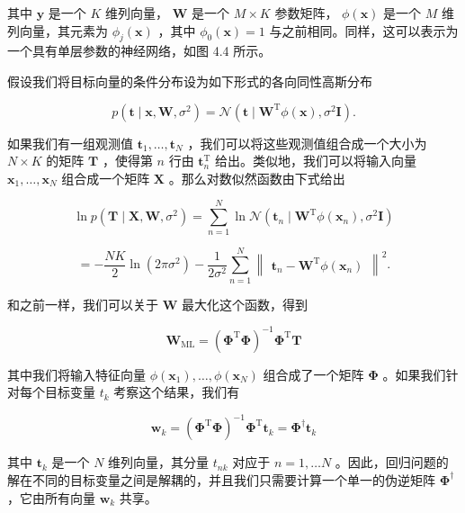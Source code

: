 \documentclass[10pt]{report}
\begin{document}
其中 \(\mathbf{y}\) 是一个 \(K\) 维列向量， \(\mathbf{W}\) 是一个 \(M \times  K\) 参数矩阵， \(\phi \left( \mathbf{x}\right)\) 是一个 \(M\) 维列向量，其元素为 \({\phi }_{j}\left( \mathbf{x}\right)\) ，其中 \({\phi }_{0}\left( \mathbf{x}\right)  = 1\) 与之前相同。同样，这可以表示为一个具有单层参数的神经网络，如图 4.4 所示。

假设我们将目标向量的条件分布设为如下形式的各向同性高斯分布

\[
p\left( {\mathbf{t} \mid  \mathbf{x},\mathbf{W},{\sigma }^{2}}\right)  = \mathcal{N}\left( {\mathbf{t} \mid  {\mathbf{W}}^{\mathrm{T}}\phi \left( \mathbf{x}\right) ,{\sigma }^{2}\mathbf{I}}\right) . \tag{4.29}
\]

如果我们有一组观测值 \({\mathbf{t}}_{1},\ldots ,{\mathbf{t}}_{N}\) ，我们可以将这些观测值组合成一个大小为 \(N \times  K\) 的矩阵 \(\mathbf{T}\) ，使得第 \(n\) 行由 \({\mathbf{t}}_{n}^{\mathrm{T}}\) 给出。类似地，我们可以将输入向量 \({\mathbf{x}}_{1},\ldots ,{\mathbf{x}}_{N}\) 组合成一个矩阵 \(\mathbf{X}\) 。那么对数似然函数由下式给出

\[
\ln p\left( {\mathbf{T} \mid  \mathbf{X},\mathbf{W},{\sigma }^{2}}\right)  = \mathop{\sum }\limits_{{n = 1}}^{N}\ln \mathcal{N}\left( {{\mathbf{t}}_{n} \mid  {\mathbf{W}}^{\mathrm{T}}\phi \left( {\mathbf{x}}_{n}\right) ,{\sigma }^{2}\mathbf{I}}\right)
\]

\[
=  - \frac{NK}{2}\ln \left( {{2\pi }{\sigma }^{2}}\right)  - \frac{1}{2{\sigma }^{2}}\mathop{\sum }\limits_{{n = 1}}^{N}{\begin{Vmatrix}{\mathbf{t}}_{n} - {\mathbf{W}}^{\mathrm{T}}\phi \left( {\mathbf{x}}_{n}\right) \end{Vmatrix}}^{2}. \tag{4.30}
\]

和之前一样，我们可以关于 \(\mathbf{W}\) 最大化这个函数，得到

\[
{\mathbf{W}}_{\mathrm{{ML}}} = {\left( {\mathbf{\Phi }}^{\mathrm{T}}\mathbf{\Phi }\right) }^{-1}{\mathbf{\Phi }}^{\mathrm{T}}\mathbf{T} \tag{4.31}
\]

其中我们将输入特征向量 \(\phi \left( {\mathbf{x}}_{1}\right) ,\ldots ,\phi \left( {\mathbf{x}}_{N}\right)\) 组合成了一个矩阵 \(\mathbf{\Phi }\) 。如果我们针对每个目标变量 \({t}_{k}\) 考察这个结果，我们有

\[
{\mathbf{w}}_{k} = {\left( {\mathbf{\Phi }}^{\mathrm{T}}\mathbf{\Phi }\right) }^{-1}{\mathbf{\Phi }}^{\mathrm{T}}{\mathbf{t}}_{k} = {\mathbf{\Phi }}^{ \dagger  }{\mathbf{t}}_{k} \tag{4.32}
\]

其中 \({\mathbf{t}}_{k}\) 是一个 \(N\) 维列向量，其分量 \({t}_{nk}\) 对应于 \(n = 1,\ldots N\) 。因此，回归问题的解在不同的目标变量之间是解耦的，并且我们只需要计算一个单一的伪逆矩阵 \({\mathbf{\Phi }}^{ \dagger  }\) ，它由所有向量 \({\mathbf{w}}_{k}\) 共享。
\end{document}
